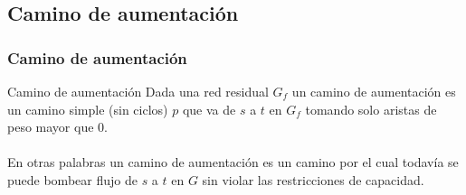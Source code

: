 \documentclass{beamer}
\begin{document}
	\subsection{Camino de aumentación}
		\begin{frame}
			\frametitle{Camino de aumentación}
			\begin{block}{Camino de aumentación}
				Dada una red residual $G_f$ un camino de aumentación es un camino simple (sin ciclos) $p$ que va de $s$ a $t$ en $G_f$ tomando solo aristas de peso mayor que 0.\\ \quad \\
				En otras palabras un camino de aumentación es un camino por el cual todavía se puede bombear flujo de $s$ a $t$ en $G$ sin violar las restricciones de capacidad.
			\end{block}
		\end{frame}
	
\end{document}
